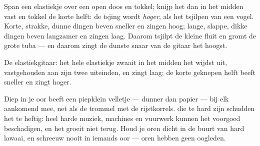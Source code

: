 \begin{example}\label{ex:g3:sound-around-us:pitch}
Span een elastiekje over een open doos en tokkel; knijp het dan in het
midden vast en tokkel de korte helft: de tsjing wordt \emph{hoger},
als het tsjilpen van een vogel. Korte, strakke, dunne dingen beven
sneller en zingen hoog; lange, slappe, dikke dingen beven langzamer en
zingen laag. Daarom tsjilpt de kleine fluit en gromt de grote tuba ---
en daarom zingt de dunste snaar van de gitaar het hoogst.
\end{example}

\begin{omfigure}

{\small De elastiekgitaar: het hele elastiekje zwaait in het midden
het wijdst uit, vastgehouden aan zijn twee uiteinden, en zingt laag;
de korte geknepen helft beeft sneller en zingt hoger.}
\end{omfigure}

\begin{remark}\label{rem:g3:sound-around-us:ears}
Diep in je oor beeft een piepklein velletje --- dunner dan papier ---
bij elk aankomend  mee, net als de trommel met de rijstkorrels.
 die te hard zijn schudden het te heftig: heel harde
muziek, machines en vuurwerk kunnen het voorgoed beschadigen, en het
groeit niet terug. Houd je oren dicht in de buurt van hard lawaai, en
schreeuw nooit in iemands oor --- oren hebben geen oogleden.
\end{remark}

